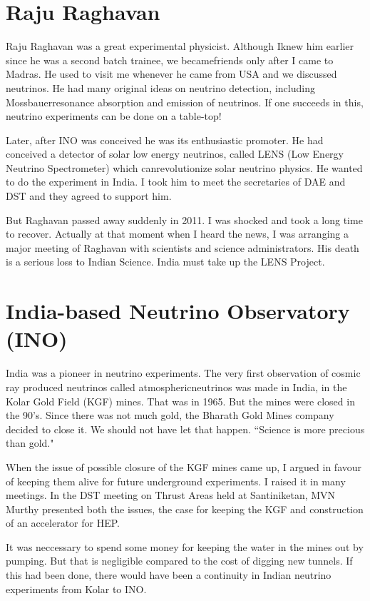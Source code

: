 \section*{Raju Raghavan}

Raju Raghavan was a great experimental physicist. Although I\break knew him 
earlier since he was a second batch trainee, we became\break friends only 
after I came to Madras. He used to visit me whenever he came from USA 
and we discussed neutrinos. He had many origi\-nal ideas on neutrino 
detection, including Mossbauer\break resonance absorption and emission of 
neutrinos. If one succeeds in this, neutrino experiments can be done on 
a table-top!
 
Later, after INO was conceived he was its enthusiastic promo\-ter. He had 
conceived a detector of solar low energy neutrinos, called LENS (Low 
Energy Neutrino Spectrometer) which can\break revolutionize solar neutrino 
physics. He wanted to do the experi\-ment in India. I took him to meet the 
secretaries of DAE and DST and they agreed to support him.

But Raghavan passed away suddenly in 2011. I was shocked and took a long 
time to recover. Actually at that moment when I heard the news, I was 
arranging a major meeting of Raghavan with scientists and science 
administrators. His death is a serious loss to Indian Science. India 
must take up the LENS Project.

\section*{India-based Neutrino Observatory (INO)}

India was a pioneer in neutrino experiments. The very first obser\-vation 
of cosmic ray produced neutrinos called atmospheric\break neutrinos was made 
in India, in the Kolar Gold Field (KGF) mines. That was in 1965. But the 
mines were closed in the 90's. Since there was not much gold, the 
Bharath Gold Mines company decided to close it. We should not have let 
that happen. ``Science is more precious than gold."
\medskip

When the issue of possible closure of the KGF mines came up, I argued in 
favour of keeping them alive for future underground experiments. I 
raised it in many meetings. In the DST meeting on Thrust Areas held at 
Santiniketan, MVN Murthy presented both the issues, the case for keeping 
the KGF and construction of an accelerator for HEP.
\medskip

It was neccessary to spend some money for keeping the water in the mines 
out by pumping. But that is negligible compared to the cost of digging 
new tunnels. If this had been done, there would have been a continuity 
in Indian neutrino experiments from Kolar to INO.
\medskip

